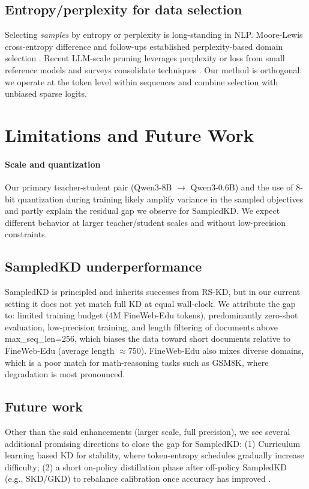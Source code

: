 \documentclass[11pt]{article}
\begin{document}
\subsection{Entropy/perplexity for data selection}
Selecting \emph{samples} by entropy or perplexity is long-standing in NLP.
Moore-Lewis cross-entropy difference and follow-ups established perplexity-based domain selection \citep{moore2010cediff,axelrod2015few,axelrod2017cynical}.
Recent LLM-scale pruning leverages perplexity or loss from small reference models \citep{ankner2024perplexedperplexityperplexitybaseddata} and surveys consolidate techniques \citep{datasel2024survey}.
Our method is orthogonal: we operate at the token level within sequences and combine selection with unbiased sparse logits.

\section{Limitations and Future Work}
\label{sec:limits}
\paragraph{Scale and quantization}
Our primary teacher-student pair (Qwen3-8B $\rightarrow$ Qwen3-0.6B) and the use of 8-bit quantization during training likely amplify variance in the sampled objectives and partly explain the residual gap we observe for SampledKD.
We expect different behavior at larger teacher/student scales and without low-precision constraints.

\subsection{SampledKD underperformance}
SampledKD is principled and inherits successes from RS-KD, but in our current setting it does not yet match full KD at equal wall-clock.
We attribute the gap to: limited training budget (4M FineWeb-Edu tokens), predominantly zero-shot evaluation, low-precision training, and length filtering of documents above max\_seq\_len=256, which biases the data toward short documents relative to FineWeb-Edu (average length $\approx750$).
FineWeb-Edu also mixes diverse domains, which is a poor match for math-reasoning tasks such as GSM8K, where degradation is most pronounced.

\subsection{Future work}
Other than the said enhancements (larger scale, full precision), we see several additional promising directions to close the gap for SampledKD:
(1) Curriculum learning based KD for stability, where token-entropy schedules gradually increase difficulty;
(2) a short on-policy distillation phase after off-policy SampledKD (e.g., SKD/GKD) to rebalance calibration once accuracy has improved \citep{xu2024speculative}.
\end{document}
